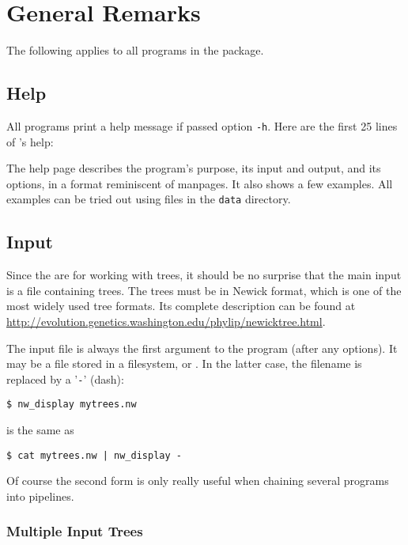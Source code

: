 
\chapter{General Remarks}
\label{chap_general}

The following applies to all programs in the \nutils{} package.

\section{Help}
\label{sct_help}

All programs print a help message if passed option \texttt{-h}. Here are the
first 25 lines of \nwindent{}'s help:


\begin{samepage}

\end{samepage}

The help page describes the program's purpose, its input and output, and its
options, in a format reminiscent of \unix{} manpages. It also shows a few
examples. All examples can be tried out using files in the \texttt{data}
directory.

\section{Input}
\label{sct_input}

Since the \nutils{} are for working with trees, it should be no surprise
that the main input is a file containing trees. The trees must be in
Newick format, which is one of the most widely used tree formats. Its
complete description can be found at
\url{http://evolution.genetics.washington.edu/phylip/newicktree.html}.

The input file is always the first argument to the program (after any options).
It may be a file stored in a filesystem, or \stdin{}. In the latter case, the
filename is replaced by a '\texttt{-}' (dash):
\begin{samepage}
\begin{verbatim}
$ nw_display mytrees.nw
\end{verbatim}
is the same as
\begin{verbatim}
$ cat mytrees.nw | nw_display -
\end{verbatim}
\end{samepage}
Of course the second form is only really useful when chaining several programs into pipelines.

\subsection{Multiple Input Trees}

